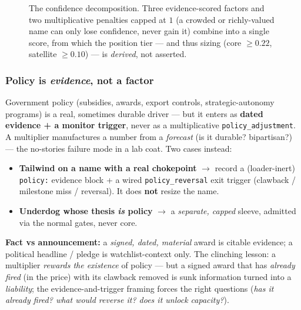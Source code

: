 \documentclass[11pt]{article}
\begin{document}
\begin{figure}[t]
\caption{The confidence decomposition. Three evidence-scored factors and two
multiplicative penalties capped at $1$ (a crowded or richly-valued name can only
lose confidence, never gain it) combine into a single score, from which the
position tier --- and thus sizing (core $\geq 0.22$, satellite $\geq 0.10$) --- is
\emph{derived}, not asserted.}
\label{fig:confidence}
\end{figure}

\subsubsection*{Policy is \emph{evidence}, not a factor}

Government policy (subsidies, awards, export controls, strategic-autonomy programs) is a real,
sometimes durable driver --- but it enters as \textbf{dated evidence + a monitor trigger}, never as
a multiplicative \texttt{policy\_adjustment}. A multiplier manufactures a number from a
\emph{forecast} (is it durable? bipartisan?) --- the no-stories failure mode in a lab coat. Two
cases instead:

\begin{itemize}
  \item \textbf{Tailwind on a name with a real chokepoint} $\to$ record a (loader-inert)
    \texttt{policy:} evidence block + a wired \texttt{policy\_reversal} exit trigger (clawback /
    milestone miss / reversal). It does \textbf{not} resize the name.
  \item \textbf{Underdog whose thesis \emph{is} policy} $\to$ a \emph{separate, capped} sleeve,
    admitted via the normal gates, never core.
\end{itemize}

\textbf{Fact vs announcement:} a \emph{signed, dated, material} award is citable evidence; a
political headline / pledge is watchlist-context only. The clinching lesson: a multiplier
\emph{rewards the existence} of policy --- but a signed award that has \emph{already fired} (in
the price) with its clawback removed is sunk information turned into a \emph{liability}; the
evidence-and-trigger framing forces the right questions (\emph{has it already fired? what would
reverse it? does it unlock capacity?}).
\end{document}
